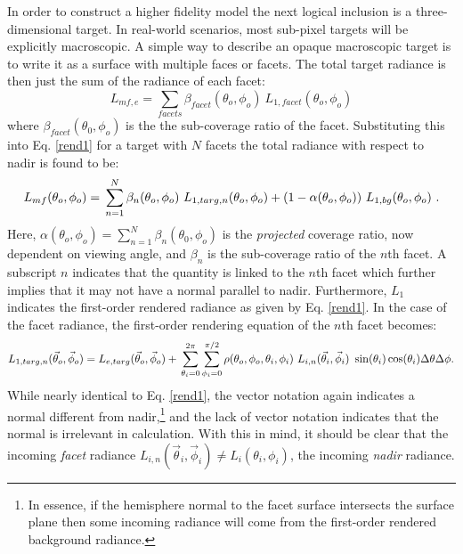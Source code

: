 \documentclass{article}
\numberwithin{equation}{section}
\begin{document}
        In order to construct a higher fidelity model the next logical inclusion is a three-dimensional target.
        In real-world scenarios, most sub-pixel targets will be explicitly macroscopic.
        A simple way to describe an opaque macroscopic target is to write it as a surface with multiple faces or
        facets.
        The total target radiance is then just the sum of the radiance of each facet:
        $$
            L_{mf, e} = \sum_{facets}\beta_{facet}(\theta_o, \phi_o)\ L_{1, facet}(\theta_o, \phi_o)
        $$
        where $\beta_{facet}(\theta_0, \phi_o)$ is the the sub-coverage ratio of the facet.
        Substituting this into Eq. \ref{rend1} for a target with $N$ facets the total radiance with respect to
        nadir is found to be:
        \begin{equation} \label{mfsimp}
            L_{mf}(\theta_o, \phi_o) = \\
                \sum_{n=1}^N\beta_{n}(\theta_o, \phi_o)\ L_{1, targ, n}(\theta_o, \phi_o) + \\
                (1 - \alpha(\theta_o, \phi_o))\ L_{1, bg}(\theta_o, \phi_o)\ .
        \end{equation}
        Here, $\alpha(\theta_o, \phi_o) = \sum_{n=1}^N \beta_{n}(\theta_0, \phi_o)$ is the \textit{projected}
        coverage ratio, now dependent on viewing angle, and $\beta_{n}$ is the sub-coverage ratio of the $n$th
        facet.
        A subscript $n$ indicates that the quantity is linked to the $n$th facet which further implies that it may
        not have a normal parallel to nadir.
        Furthermore, $L_{1}$ indicates the first-order rendered radiance as given by Eq. \ref{rend1}.
        In the case of the facet radiance, the first-order rendering equation of the $n$th facet becomes:
        \begin{equation} \label{radio1facet}
            L_{1, targ, n}(\vec\theta_o, \vec\phi_o) = \\
                L_{e, targ}(\vec\theta_o, \vec\phi_o) + \\
                \sum_{\theta_i=0}^{2\pi} \sum_{\phi_i=0}^{\pi/2} \\
                \rho(\theta_o, \phi_o, \theta_i, \phi_i)\
                L_{i, n}(\vec\theta_i, \vec\phi_i)\ \sin(\theta_i)\cos(\theta_i) \Delta\theta \Delta\phi .
        \end{equation}
        While nearly identical to Eq. \ref{rend1}, the vector notation again indicates a normal different from 
        nadir,\footnote{
            In essence, if the hemisphere normal to the facet surface intersects the surface plane then some
            incoming radiance will come from the first-order rendered background radiance.
        } and the lack of vector notation indicates that the normal is irrelevant in calculation.
        With this in mind, it should be clear that the incoming \textit{facet} radiance 
        $L_{i, n}(\vec\theta_i, \vec\phi_i) \neq L_i(\theta_i, \phi_i)$, the incoming \textit{nadir} radiance.
\end{document}
